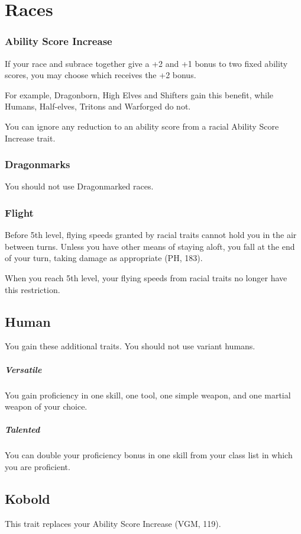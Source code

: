 \documentclass[letterpaper,twocolumn,openany,nodeprecatedcode]{dndbook}
\begin{document}
\section{Races}

\subsubsection{Ability Score Increase}
If your race and subrace together give a +2 and +1 bonus to two fixed ability scores, you may choose which receives the +2 bonus.

For example, Dragonborn, High Elves and Shifters gain this benefit, while Humans, Half-elves, Tritons and Warforged do not.

You can ignore any reduction to an ability score from a racial Ability Score Increase trait.

\subsubsection{Dragonmarks} You should not use Dragonmarked races.

\subsubsection{Flight} Before 5th level, flying speeds granted by racial traits cannot hold you in the air between turns. Unless you have other means of staying aloft, you fall at the end of your turn, taking damage as appropriate (PH, 183).

When you reach 5th level, your flying speeds from racial traits no longer have this restriction.

\subsection{Human}
You gain these additional traits. You should not use variant humans.

\subparagraph{Versatile} You gain proficiency in one skill, one tool, one simple weapon, and one martial weapon of your choice.
\subparagraph{Talented} You can double your proficiency bonus in one skill from your class list in which you are proficient.

\subsection{Kobold}
This trait replaces your Ability Score Increase (VGM, 119).
\end{document}
